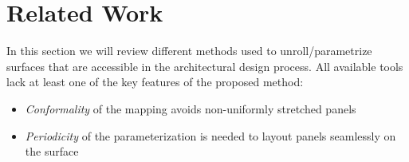 \documentclass[article.tex]{subfiles}
\begin{document}
\section{Related Work}
\label{sec:parameterization}

In this section we will review different methods used to
unroll/parametrize surfaces that are accessible in the architectural design
process. All available tools lack at least one of the key features of the 
proposed method: 
\smallskip
\begin{itemize}
\item \emph{Conformality} of the mapping avoids non-uniformly stretched
  panels
\item \emph{Periodicity} of the parameterization is needed to layout
  panels seamlessly on the surface
\end{itemize}



\end{document}
